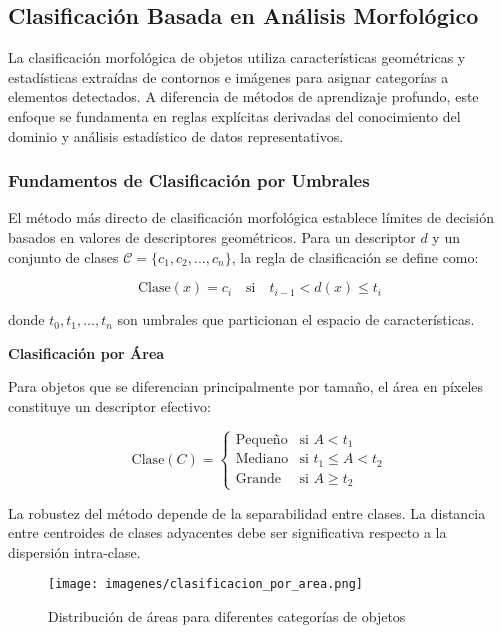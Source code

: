 \subsection{Clasificación Basada en Análisis Morfológico}

La clasificación morfológica de objetos utiliza características geométricas y estadísticas extraídas de contornos e imágenes para asignar categorías a elementos detectados. A diferencia de métodos de aprendizaje profundo, este enfoque se fundamenta en reglas explícitas derivadas del conocimiento del dominio y análisis estadístico de datos representativos.

\subsubsection{Fundamentos de Clasificación por Umbrales}

El método más directo de clasificación morfológica establece límites de decisión basados en valores de descriptores geométricos. Para un descriptor $d$ y un conjunto de clases $\mathcal{C} = \{c_1, c_2, ..., c_n\}$, la regla de clasificación se define como:

\begin{equation}
\text{Clase}(x) = c_i \quad \text{si} \quad t_{i-1} < d(x) \leq t_i
\end{equation}

donde $t_0, t_1, ..., t_n$ son umbrales que particionan el espacio de características.

\textbf{Clasificación por Área}

Para objetos que se diferencian principalmente por tamaño, el área en píxeles constituye un descriptor efectivo:

\begin{equation}
\text{Clase}(C) = \begin{cases}
\text{Pequeño} & \text{si } A < t_1 \\
\text{Mediano} & \text{si } t_1 \leq A < t_2 \\
\text{Grande} & \text{si } A \geq t_2
\end{cases}
\end{equation}

La robustez del método depende de la separabilidad entre clases. La distancia entre centroides de clases adyacentes debe ser significativa respecto a la dispersión intra-clase.

\begin{figure}[h]
\centering
\texttt{[image: imagenes/clasificacion\_por\_area.png]}
\caption{Distribución de áreas para diferentes categorías de objetos}
\label{fig:clasificacion_area}
\end{figure}

